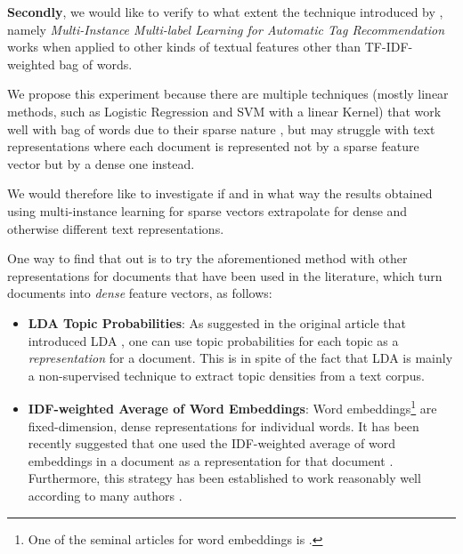 \textbf{Secondly}, we would like to verify to what extent the technique introduced by \cite{shen_etal_2009}, namely \textit{Multi-Instance Multi-label Learning for Automatic Tag Recommendation} works when applied to other kinds of textual features other than TF-IDF-weighted bag of words.

We propose this experiment because there are multiple techniques (mostly linear methods, such as Logistic Regression and SVM with a linear Kernel) that work well with bag of words due to their sparse nature \citep{hsu_etal_2010, li_etal_2015}, but may struggle with text representations where each document is represented not by a sparse feature vector but by a dense one instead.

We would therefore like to investigate if and in what way the results obtained using multi-instance learning for sparse vectors extrapolate for dense and otherwise different text representations.

One way to find that out is to try the aforementioned method with other representations for documents that have been used in the literature, which turn documents into \textit{dense} feature vectors, as follows:

\begin{itemize}
    \item \textbf{LDA Topic Probabilities}: As suggested in the original article that introduced LDA \citep{blei_etal_2003}, one can use topic probabilities for each topic as a \textit{representation} for a document. This is in spite of the fact that LDA is mainly a non-supervised technique to extract topic densities from a text corpus.
    
    \item \textbf{IDF-weighted Average of Word Embeddings}: Word embeddings\footnote{One of the seminal articles for word embeddings is \cite{bengio_etal_2003}.} are fixed-dimension, dense representations for individual words. It has been recently suggested that one used the IDF-weighted average of word embeddings in a document as a representation for that document \citep{zhao_etal_2015,correa_etal_2017}. Furthermore, this strategy has been established to work reasonably well according to many authors \citep{wieting_etal_2016,arora_etal_2017}.
    
\end{itemize}


